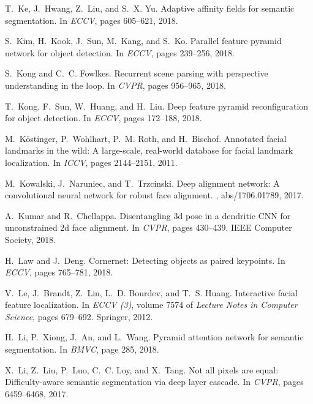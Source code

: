 \documentclass[10pt,twocolumn,letterpaper]{article}
\begin{document}
{\begin{thebibliography}{100}
T.~Ke, J.~Hwang, Z.~Liu, and S.~X. Yu.
\newblock Adaptive affinity fields for semantic segmentation.
\newblock In {\em {ECCV}}, pages 605--621, 2018.

S.~Kim, H.~Kook, J.~Sun, M.~Kang, and S.~Ko.
\newblock Parallel feature pyramid network for object detection.
\newblock In {\em {ECCV}}, pages 239--256, 2018.

S.~Kong and C.~C. Fowlkes.
\newblock Recurrent scene parsing with perspective understanding in the loop.
\newblock In {\em {CVPR}}, pages 956--965, 2018.

T.~Kong, F.~Sun, W.~Huang, and H.~Liu.
\newblock Deep feature pyramid reconfiguration for object detection.
\newblock In {\em {ECCV}}, pages 172--188, 2018.

M.~K{\"{o}}stinger, P.~Wohlhart, P.~M. Roth, and H.~Bischof.
\newblock Annotated facial landmarks in the wild: {A} large-scale, real-world
  database for facial landmark localization.
\newblock In {\em {ICCV}}, pages 2144--2151, 2011.

M.~Kowalski, J.~Naruniec, and T.~Trzcinski.
\newblock Deep alignment network: {A} convolutional neural network for robust
  face alignment.
, abs/1706.01789, 2017.

A.~Kumar and R.~Chellappa.
\newblock Disentangling 3d pose in a dendritic {CNN} for unconstrained 2d face
  alignment.
\newblock In {\em {CVPR}}, pages 430--439. {IEEE} Computer Society, 2018.

H.~Law and J.~Deng.
\newblock Cornernet: Detecting objects as paired keypoints.
\newblock In {\em {ECCV}}, pages 765--781, 2018.

V.~Le, J.~Brandt, Z.~Lin, L.~D. Bourdev, and T.~S. Huang.
\newblock Interactive facial feature localization.
\newblock In {\em {ECCV} {(3)}}, volume 7574 of {\em Lecture Notes in Computer
  Science}, pages 679--692. Springer, 2012.

H.~Li, P.~Xiong, J.~An, and L.~Wang.
\newblock Pyramid attention network for semantic segmentation.
\newblock In {\em {BMVC}}, page 285, 2018.

X.~Li, Z.~Liu, P.~Luo, C.~C. Loy, and X.~Tang.
\newblock Not all pixels are equal: Difficulty-aware semantic segmentation via
  deep layer cascade.
\newblock In {\em {CVPR}}, pages 6459--6468, 2017.


\end{thebibliography}}
\end{document}
